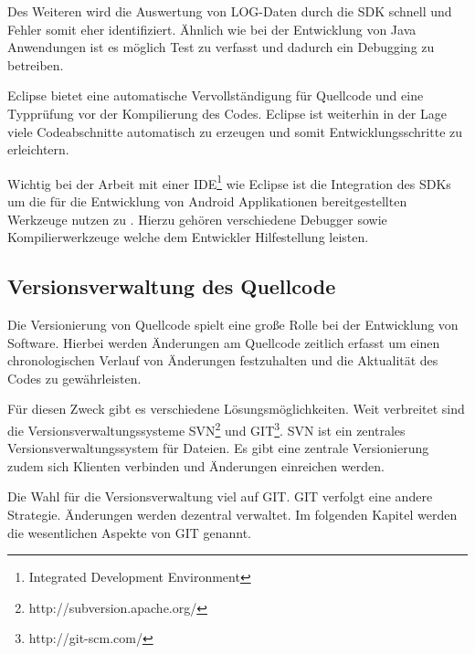 Des Weiteren wird die Auswertung von LOG-Daten durch die SDK schnell und Fehler somit eher identifiziert. Ähnlich wie bei der Entwicklung von Java Anwendungen ist es möglich Test zu verfasst und dadurch ein Debugging zu betreiben.

Eclipse bietet eine automatische Vervollständigung für Quellcode und eine Typprüfung vor der Kompilierung des Codes. Eclipse ist weiterhin in der Lage viele Codeabschnitte automatisch zu erzeugen und somit Entwicklungsschritte zu erleichtern.

Wichtig bei der Arbeit mit einer IDE\footnote{Integrated Development Environment} wie Eclipse ist die Integration des SDKs um die für die Entwicklung von Android Applikationen bereitgestellten Werkzeuge nutzen zu  . Hierzu gehören verschiedene Debugger sowie Kompilierwerkzeuge welche dem Entwickler Hilfestellung leisten.

\subsection{Versionsverwaltung des Quellcode}

Die Versionierung von Quellcode spielt eine große Rolle bei der Entwicklung von Software. Hierbei werden Änderungen am Quellcode zeitlich erfasst um einen chronologischen Verlauf von Änderungen festzuhalten und die Aktualität des Codes zu gewährleisten.

Für diesen Zweck gibt es verschiedene Lösungsmöglichkeiten. Weit verbreitet sind die Versionsverwaltungssysteme SVN\footnote{http://subversion.apache.org/} und GIT\footnote{http://git-scm.com/}.
SVN ist ein zentrales Versionsverwaltungssystem für Dateien. Es gibt eine zentrale Versionierung zudem sich Klienten verbinden und Änderungen einreichen werden.

Die Wahl für die Versionsverwaltung viel auf GIT. GIT verfolgt eine andere Strategie. Änderungen werden dezentral verwaltet. Im folgenden Kapitel werden die wesentlichen Aspekte von GIT genannt.

